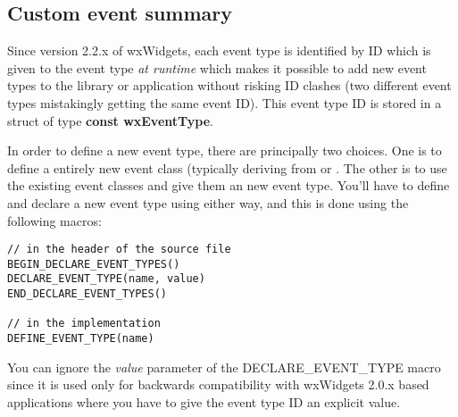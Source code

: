 \begin{twocollist}
\end{twocollist}

\subsection{Custom event summary}\label{customevents}


Since version 2.2.x of wxWidgets, each event type is identified by ID which
is given to the event type {\it at runtime} which makes it possible to add
new event types to the library or application without risking ID clashes
(two different event types mistakingly getting the same event ID). This
event type ID is stored in a struct of type {\bf const wxEventType}.

In order to define a new event type, there are principally two choices.
One is to define a entirely new event class (typically deriving from
 or . 
The other is to use the existing event classes and give them an new event
type. You'll have to define and declare a new event type using either way,
and this is done using the following macros:

\begin{verbatim}
// in the header of the source file
BEGIN_DECLARE_EVENT_TYPES()
DECLARE_EVENT_TYPE(name, value)
END_DECLARE_EVENT_TYPES()

// in the implementation
DEFINE_EVENT_TYPE(name)
\end{verbatim}

You can ignore the {\it value} parameter of the DECLARE\_EVENT\_TYPE macro
since it is used only for backwards compatibility with wxWidgets 2.0.x based
applications where you have to give the event type ID an explicit value.

